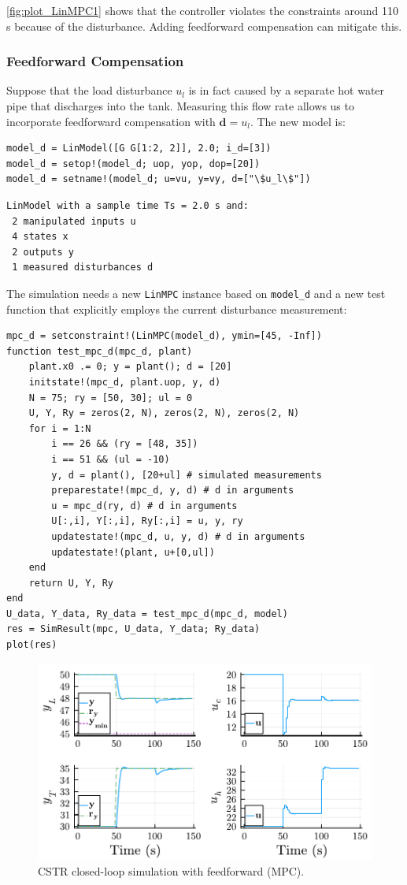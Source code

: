\cref{fig:plot_LinMPC1} shows that the controller violates the constraints around 110 s because of the disturbance. Adding feedforward compensation can mitigate this.

\subsubsection{Feedforward Compensation}

Suppose that the load disturbance $u_l$ is in fact caused by a separate hot water pipe that discharges into the tank. Measuring this flow rate allows us to incorporate feedforward compensation with $\mathbf{d}=u_l$. The new model is:

\begin{verbatim}
model_d = LinModel([G G[1:2, 2]], 2.0; i_d=[3])
model_d = setop!(model_d; uop, yop, dop=[20])
model_d = setname!(model_d; u=vu, y=vy, d=["\$u_l\$"])
\end{verbatim}
\spacerepl
\begin{verbatim}
LinModel with a sample time Ts = 2.0 s and:
 2 manipulated inputs u
 4 states x
 2 outputs y
 1 measured disturbances d
\end{verbatim}
The simulation needs a new \texttt{LinMPC} instance based on \texttt{model\_d} and a new test function that explicitly employs the current disturbance measurement:
\begin{verbatim}
mpc_d = setconstraint!(LinMPC(model_d), ymin=[45, -Inf])
function test_mpc_d(mpc_d, plant)
    plant.x0 .= 0; y = plant(); d = [20]
    initstate!(mpc_d, plant.uop, y, d)
    N = 75; ry = [50, 30]; ul = 0
    U, Y, Ry = zeros(2, N), zeros(2, N), zeros(2, N)
    for i = 1:N
        i == 26 && (ry = [48, 35])
        i == 51 && (ul = -10)
        y, d = plant(), [20+ul] # simulated measurements
        preparestate!(mpc_d, y, d) # d in arguments
        u = mpc_d(ry, d) # d in arguments
        U[:,i], Y[:,i], Ry[:,i] = u, y, ry
        updatestate!(mpc_d, u, y, d) # d in arguments
        updatestate!(plant, u+[0,ul])
    end
    return U, Y, Ry
end
U_data, Y_data, Ry_data = test_mpc_d(mpc_d, model)
res = SimResult(mpc, U_data, Y_data; Ry_data)
plot(res)
\end{verbatim}

\begin{figure}[h]
    \centering
    \includegraphics[width=\columnwidth]{fig/plot_LinMPC2.pdf}
    \caption{CSTR closed-loop simulation with feedforward (MPC).}\label{fig:plot_LinMPC2}
\end{figure}

